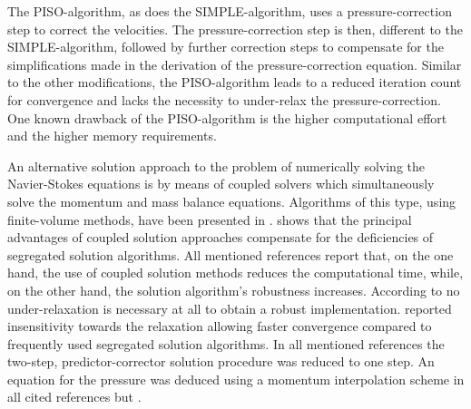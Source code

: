 The PISO-algorithm, as does the SIMPLE-algorithm, uses a pressure-correction step to correct the velocities. The pressure-correction step is then, different to the SIMPLE-algorithm, followed by further correction steps to compensate for the simplifications made in the derivation of the pressure-correction equation. Similar to the other modifications, the PISO-algorithm leads to a reduced iteration count for convergence and lacks the necessity to under-relax the pressure-correction. One known drawback of the PISO-algorithm is the higher computational effort and the higher memory requirements.

An alternative solution approach to the problem of numerically solving the Navier-Stokes equations is by means of coupled solvers which simultaneously solve the momentum and mass balance equations. Algorithms of this type, using finite-volume methods, have been presented in \cite{chen10,darwish09,falk13,galpin86,klaij13,mangani14,vakilipour12}. \cite{darwish09} shows that the principal advantages of coupled solution approaches compensate for the deficiencies of segregated solution algorithms. All mentioned references report that, on the one hand, the use of coupled solution methods reduces the computational time, while, on the other hand, the solution algorithm's robustness increases. According to \cite{darwish09} no under-relaxation is necessary at all to obtain a robust implementation. \cite{galpin86} reported insensitivity towards the relaxation allowing faster convergence compared to frequently used segregated solution algorithms. In all mentioned references the two-step, predictor-corrector solution procedure was reduced to one step. An equation for the pressure was deduced using a momentum interpolation scheme \cite{rhie82} in all cited references but \cite{galpin86}.

